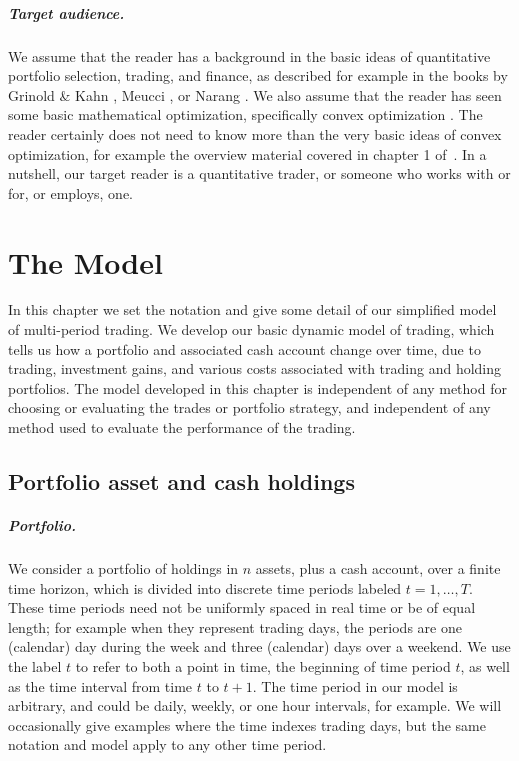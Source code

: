 \documentclass[openany]{article}  %
\begin{document}
\paragraph{Target audience.}
We assume that the reader has a background in the basic ideas of
quantitative portfolio selection, trading, and finance, as described for
example in the books by
Grinold \& Kahn \cite{grinold1999active}, Meucci \cite{meucci2005risk}, or Narang \cite{narang2013inside}.
We also assume that the reader has seen some basic
mathematical optimization, specifically convex optimization \cite{boyd2004convex}.
The reader certainly does not need to know more than the very basic ideas
of convex optimization, for example the overview material covered in
chapter 1 of~\cite{boyd2004convex}.
In a nutshell, our target reader is a quantitative trader,
or someone who works with or for, or employs, one.

\chapter{The Model}\label{s-model}
In this chapter we set the notation and give some detail of
our simplified model of multi-period trading.
We develop our basic dynamic model of trading, which tells us
how a portfolio and associated cash account change over time,
due to trading, investment gains, and various costs associated with
trading and holding portfolios.
The model developed in this chapter
is independent of any method for choosing or evaluating the
trades or portfolio strategy, and independent of any method used to
evaluate the performance of the trading.

\section{Portfolio asset and cash holdings}
\paragraph{Portfolio.}
We consider a portfolio of holdings in $n$ assets,
plus a cash account, over a finite time horizon, which is
divided into discrete time periods labeled $t=1,\ldots,T$.
These time periods need not be
uniformly spaced in real time or be of equal length; for example when they
represent trading days, the periods are one (calendar) day during
the week and three (calendar) days over a weekend.
We use the label $t$ to refer to both
a point in time, the beginning of time period $t$,
as well as the time interval from time $t$ to $t+1$.
The time period in our model is arbitrary, and could be daily, weekly,
or one hour intervals, for example.  We will occasionally give examples
where the time indexes trading days, but the same notation and model
apply to any other time period.
\end{document}
